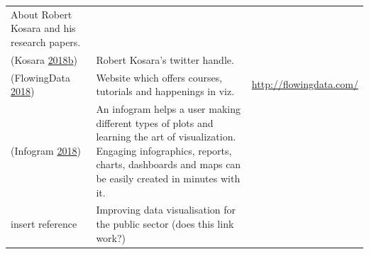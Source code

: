 \documentclass[]{book}
\begin{document}
\begin{longtable}[]{@{}lll@{}}
\begin{minipage}[t]{0.28\columnwidth}
About Robert Kosara and his research papers.\strut
\end{minipage} & \begin{minipage}[t]{0.48\columnwidth}\raggedright
\strut
\end{minipage}\tabularnewline
\begin{minipage}[t]{0.15\columnwidth}\raggedright
(Kosara \protect\hyperlink{ref-twitter_Kosara}{2018}\protect\hyperlink{ref-twitter_Kosara}{b})\strut
\end{minipage} & \begin{minipage}[t]{0.28\columnwidth}\raggedright
Robert Kosara's twitter handle.\strut
\end{minipage} & \begin{minipage}[t]{0.48\columnwidth}\raggedright
\strut
\end{minipage}\tabularnewline
\begin{minipage}[t]{0.15\columnwidth}\raggedright
(FlowingData \protect\hyperlink{ref-flowingdata}{2018})\strut
\end{minipage} & \begin{minipage}[t]{0.28\columnwidth}\raggedright
Website which offers courses, tutorials and happenings in viz.\strut
\end{minipage} & \begin{minipage}[t]{0.48\columnwidth}\raggedright
\url{http://flowingdata.com/}\strut
\end{minipage}\tabularnewline
\begin{minipage}[t]{0.15\columnwidth}\raggedright
(Infogram \protect\hyperlink{ref-infogram}{2018})\strut
\end{minipage} & \begin{minipage}[t]{0.28\columnwidth}\raggedright
An infogram helps a user making different types of plots and learning the art of visualization. Engaging infographics, reports, charts, dashboards and maps can be easily created in minutes with it.\strut
\end{minipage} & \begin{minipage}[t]{0.48\columnwidth}\raggedright
\strut
\end{minipage}\tabularnewline
\begin{minipage}[t]{0.15\columnwidth}\raggedright
insert reference\strut
\end{minipage} & \begin{minipage}[t]{0.28\columnwidth}\raggedright
Improving data visualisation for the public sector (does this link work?)\strut
\end{minipage} & \begin{minipage}[t]{0.48\columnwidth}\raggedright

\end{minipage}
\end{longtable}
\end{document}
